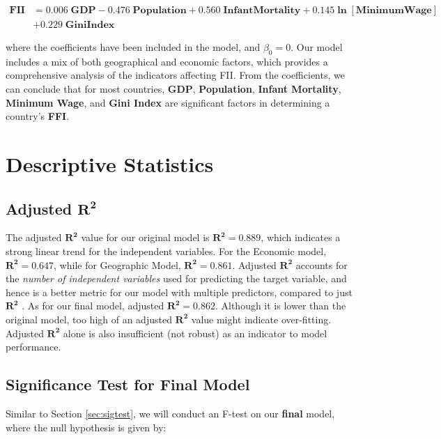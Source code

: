 \documentclass{article}
\begin{document}
\begin{equation}\label{geographicmodel}
    \begin{aligned}
        \mathbf{FII} &= 0.006\;\mathbf{GDP} - 0.476\;\mathbf{Population} + 0.560\;\mathbf{InfantMortality} + 0.145\bm{\ln{[\text{MinimumWage}]}} \\ &+ 0.229\;\mathbf{GiniIndex}
    \end{aligned}
\end{equation}

\noindent where the coefficients have been included in the model, and $\beta_0 = 0$. Our model includes a mix of both geographical and economic factors, which provides a comprehensive analysis of the indicators affecting FII. From the coefficients, we can conclude that for most countries, \textbf{GDP}, \textbf{Population}, \textbf{Infant Mortality}, \textbf{Minimum Wage}, and \textbf{Gini Index} are significant factors in determining a country's \textbf{FFI}. 

\section{Descriptive Statistics}

\subsection{Adjusted $\bm{R^2}$}
The adjusted $\bm{R^2}$ value for our original model is $\bm{R^2} = 0.889$, which indicates a strong linear trend for the independent variables. For the Economic model, $\bm{R^2} = 0.647$, while for Geographic Model, $\bm{R^2} = 0.861$. Adjusted $\bm{R^2}$ accounts for the \textit{number of independent variables} used for predicting the target variable, and hence is a better metric for our model with multiple predictors, compared to just $\bm{R^2}$ \cite{adjsutedrsquared}. As for our final model, adjusted $\bm{R^2} = 0.862$. Although it is lower than the original model, too high of an adjusted $\bm{R^2}$ value might indicate over-fitting. Adjusted $\bm{R^2}$ alone is also insufficient (not robust) as an indicator to model performance.

\subsection{Significance Test for Final Model}
Similar to Section \ref{sec:sigtest}, we will conduct an F-test on our \textbf{final} model, where the null hypothesis is given by: 
\end{document}
